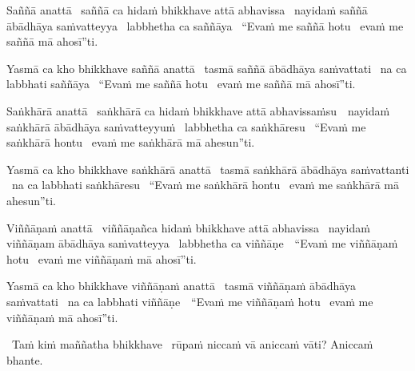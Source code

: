 \begin{pali-hang}
  Saññā anattā \breathmark\ saññā ca hidaṁ bhikkhave attā abhavissa \breathmark\ nayidaṁ saññā ābādhāya saṁvatteyya \breathmark\ labbhetha ca saññāya \breathmark\ ``Evaṁ me saññā hotu \breathmark\ evaṁ me saññā mā ahosī''ti.
\end{pali-hang}

\begin{pali-hang}
  Yasmā ca kho bhikkhave saññā anattā \breathmark\ tasmā saññā ābādhāya saṁvattati \breathmark\ na ca labbhati saññāya \breathmark\ ``Evaṁ me saññā hotu \breathmark\ evaṁ me saññā mā ahosī''ti.
\end{pali-hang}

\begin{pali-hang}
  Saṅkhārā anattā \breathmark\ saṅkhārā ca hidaṁ bhikkhave attā \mbox{abhavissaṁsu}~\breathmark\ nayidaṁ saṅkhārā ābādhāya saṁvatteyyuṁ \breathmark\ labbhetha ca saṅkhāresu \breathmark\ ``Evaṁ me saṅkhārā hontu \breathmark\ evaṁ me saṅkhārā mā ahesun''ti.
\end{pali-hang}

\begin{pali-hang}
  Yasmā ca kho bhikkhave saṅkhārā anattā \breathmark\ tasmā saṅkhārā ābādhāya saṁvattanti \breathmark\ na ca labbhati saṅkhāresu \breathmark\ ``Evaṁ me saṅkhārā hontu \breathmark\ evaṁ me saṅkhārā mā ahesun''ti.
\end{pali-hang}

\begin{pali-hang}
  Viññāṇaṁ anattā \breathmark\ viññāṇañca hidaṁ bhikkhave attā abhavissa \breathmark\ nayidaṁ viññāṇam ābādhāya saṁvatteyya \breathmark\ labbhetha ca \mbox{viññāṇe}~\breathmark\ ``Evaṁ me viññāṇaṁ hotu \breathmark\ evaṁ me viññāṇaṁ mā ahosī''ti.
\end{pali-hang}

\begin{pali-hang}
  Yasmā ca kho bhikkhave viññāṇaṁ anattā \breathmark\ tasmā viññāṇaṁ ābādhāya saṁvattati \breathmark\ na ca labbhati \mbox{viññāṇe}~\breathmark\ ``Evaṁ me viññāṇaṁ hotu \breathmark\ evaṁ me viññāṇaṁ mā ahosī''ti.
\end{pali-hang}

\begin{pali-hang}
  \anglebracketleft\ \hspace{-0.5mm}Taṁ kiṁ maññatha bhikkhave \hspace{-0.5mm}\anglebracketright\ rūpaṁ niccaṁ vā aniccaṁ vāti? Aniccaṁ bhante.
\end{pali-hang}

